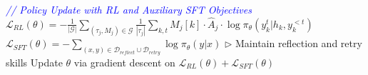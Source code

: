 \begin{algorithm*}[t]
\begin{algorithmic}[1]
        \STATE \textcolor{blue}{\textit{// Policy Update with RL and Auxiliary SFT Objectives}}
        \STATE $\mathcal{L}_{RL}(\theta) = -\frac{1}{|\mathcal{G}|} \sum_{(\tau_j, M_j) \in \mathcal{G}} \frac{1}{|\tau_j|} \sum_{k,t} M_j[k] \cdot \hat{A}_j \cdot \log \pi_{\theta}(y_k^t | h_k, y_k^{<t})$
        \STATE $\mathcal{L}_{SFT}(\theta) = - \sum_{(x,y) \in \mathcal{D}_{reflect} \cup \mathcal{D}_{retry}} \log \pi_{\theta}(y|x)$ \hfill $\triangleright$ Maintain reflection and retry skills
        \STATE Update $\theta$ via gradient descent on $\mathcal{L}_{RL}(\theta) + \mathcal{L}_{SFT}(\theta)$
    \ENDFOR
\ENDWHILE
\end{algorithmic}
\end{algorithm*}